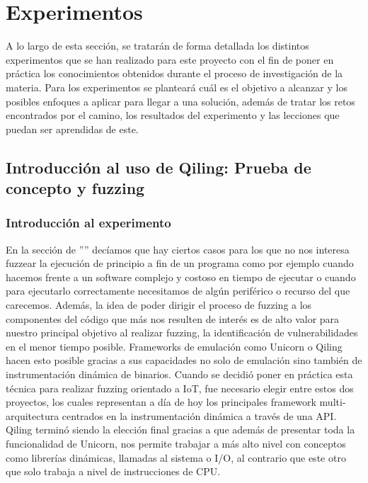 \chapter{Experimentos}
\label{experimentos}
A lo largo de esta sección, se tratarán de forma detallada los distintos experimentos que se han realizado para este proyecto con el fin de 
poner en práctica los conocimientos obtenidos durante el proceso de investigación de la materia. Para los experimentos se planteará cuál es el 
objetivo a alcanzar y los posibles enfoques a aplicar para llegar a una solución, además de tratar los retos encontrados por el camino, los 
resultados del experimento y las lecciones que puedan ser aprendidas de este.

\section{Introducción al uso de Qiling: Prueba de concepto y fuzzing}
\subsection{Introducción al experimento}
En la sección de '''' decíamos que hay ciertos casos para los que no nos interesa fuzzear la ejecución de principio a fin 
de un programa como por ejemplo cuando hacemos frente a un software complejo y costoso en tiempo de ejecutar o cuando para ejecutarlo correctamente necesitamos de algún periférico o recurso del que carecemos. Además, la idea de poder dirigir el proceso de fuzzing a los componentes del código que más nos 
resulten de interés es de alto valor para nuestro principal objetivo al realizar fuzzing, la identificación de vulnerabilidades en el menor tiempo posible.
Frameworks de emulación como Unicorn o Qiling hacen esto posible gracias a sus capacidades no solo de emulación sino también de instrumentación dinámica de binarios.
Cuando se decidió poner en práctica esta técnica para realizar fuzzing orientado a IoT, fue necesario elegir entre estos dos proyectos, los cuales 
representan a día de hoy los principales framework multi-arquitectura centrados en la instrumentación dinámica a través de una API. Qiling terminó siendo 
la elección final gracias a que además de presentar toda la funcionalidad de Unicorn, nos permite trabajar a más alto nivel con conceptos como librerías dinámicas,
llamadas al sistema o I/O, al contrario que este otro que solo trabaja a nivel de instrucciones de CPU.\bigskip

